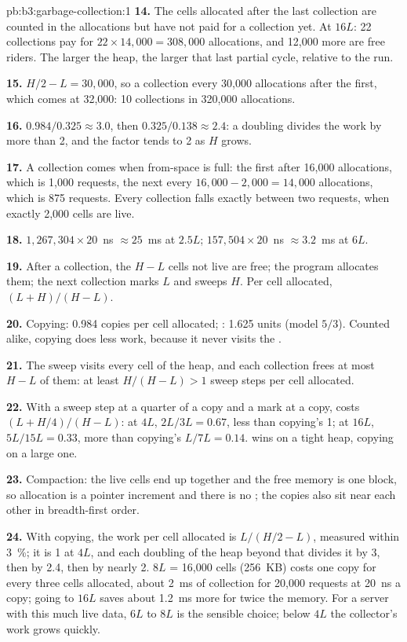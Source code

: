 \begin{solution}{pb:b3:garbage-collection:1}
\textbf{14.} The cells allocated after the last collection are counted in the allocations but have not paid for a collection yet. At $16L$: 22 collections pay for $22 \times 14{,}000 = 308{,}000$ allocations, and 12,000 more are free riders. The larger the heap, the larger that last partial cycle, relative to the run.

\textbf{15.} $H/2 - L = 30{,}000$, so a collection every 30,000 allocations after the first, which comes at 32,000: 10 collections in 320,000 allocations.

\textbf{16.} $0.984/0.325 \approx 3.0$, then $0.325/0.138 \approx 2.4$: a doubling divides the work by more than 2, and the factor tends to 2 as $H$ grows.

\textbf{17.} A collection comes when from-space is full: the first after 16,000 allocations, which is 1,000 requests, the next every $16{,}000 - 2{,}000 = 14{,}000$ allocations, which is 875 requests. Every collection falls exactly between two requests, when exactly 2,000 cells are live.

\textbf{18.} $1{,}267{,}304 \times 20$~ns $\approx 25$~ms at $2.5L$; $157{,}504 \times 20$~ns $\approx 3.2$~ms at $6L$.

\textbf{19.} After a collection, the $H - L$ cells not live are free; the program allocates them; the next collection marks $L$ and sweeps $H$. Per cell allocated, $(L + H)/(H - L)$.

\textbf{20.} Copying: 0.984 copies per cell allocated; : 1.625 units (model $5/3$). Counted alike, copying does less work, because it never visits the .

\textbf{21.} The sweep visits every cell of the heap, and each collection frees at most $H - L$ of them: at least $H/(H - L) > 1$ sweep steps per cell allocated.

\textbf{22.} With a sweep step at a quarter of a copy and a mark at a copy,  costs $(L + H/4)/(H - L)$: at $4L$, $2L/3L = 0.67$, less than copying's 1; at $16L$, $5L/15L = 0.33$, more than copying's $L/7L = 0.14$.  wins on a tight heap, copying on a large one.

\textbf{23.} Compaction: the live cells end up together and the free memory is one block, so allocation is a pointer increment and there is no ; the copies also sit near each other in breadth-first order.

\textbf{24.} With copying, the work per cell allocated is $L/(H/2 - L)$, measured within 3~\%; it is 1 at $4L$, and each doubling of the heap beyond that divides it by 3, then by 2.4, then by nearly 2. $8L$ = 16,000 cells (256~KB) costs one copy for every three cells allocated, about 2~ms of collection for 20,000 requests at 20~ns a copy; going to $16L$ saves about 1.2~ms more for twice the memory. For a server with this much live data, $6L$ to $8L$ is the sensible choice; below $4L$ the collector's work grows quickly.
\end{solution}
